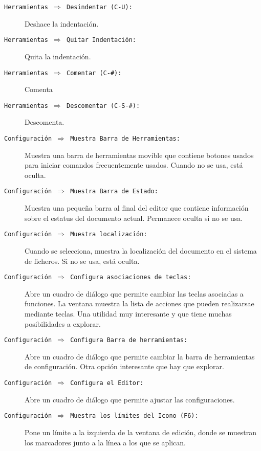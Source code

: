 \begin{description}
\item[{\tt Herramientas $\Rightarrow$  Desindentar (C-U):}] Deshace la
indentación.

\item[{\tt Herramientas  $\Rightarrow$ Quitar Indentación:}]  Quita la
indentación.

\item[{\tt Herramientas $\Rightarrow$ Comentar (C-\#):}] Comenta

\item[{\tt   Herramientas    $\Rightarrow$   Descomentar   (C-S-\#):}]
Descomenta.

\item[{\tt    Configuración    $\Rightarrow$    Muestra    Barra    de
Herramientas:}] Muestra una barra de herramientas movible que contiene
botones usados para iniciar  comandos frecuentemente usados. Cuando no
se usa, está oculta.

\item[{\tt  Configuración  $\Rightarrow$  Muestra Barra  de  Estado:}]
Muestra una pequeña barra al final del editor que contiene información
sobre el estatus del documento actual. Permanece oculta si no se usa.

\item[{\tt Configuración $\Rightarrow$  Muestra localización:}] Cuando
se selecciona, muestra la localización  del documento en el sistema de
ficheros. Si no se usa, está oculta.

\item[{\tt  Configuración  $\Rightarrow$   Configura  asociaciones  de
teclas:}] Abre  un cuadro  de diálogo que  permite cambiar  las teclas
asociadas a  funciones. La  ventana muestra la  lista de  acciones que
pueden realizarsae mediante teclas. Una utilidad muy interesante y que
tiene muchas posibilidades a explorar.

\item[{\tt    Configuración   $\Rightarrow$    Configura   Barra    de
herramientas:}] Abre un cuadro de diálogo que permite cambiar la barra
de herramientas de configuración. Otra  opción interesante que hay que
explorar.

\item[{\tt Configuración $\Rightarrow$ Configura  el Editor:}] Abre un
cuadro de diálogo que permite ajustar las configuraciones.

\item[{\tt Configuración  $\Rightarrow$ Muestra los límites  del Icono
(F6):}] Pone un límite a la  izquierda de la ventana de edición, donde
se muestran los marcadores junto a la línea a los que se aplican.


\end{description}

